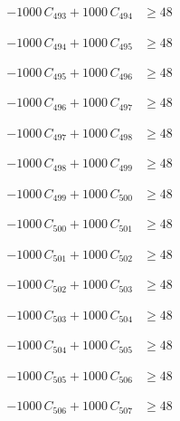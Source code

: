 \documentclass[a4paper,11pt]{article}
\begin{document}
\begin{align}
-1000\,C_{493} + 1000\,C_{494} &\geq 48 \nonumber
\end{align}

\begin{align}
-1000\,C_{494} + 1000\,C_{495} &\geq 48 \nonumber
\end{align}

\begin{align}
-1000\,C_{495} + 1000\,C_{496} &\geq 48 \nonumber
\end{align}

\begin{align}
-1000\,C_{496} + 1000\,C_{497} &\geq 48 \nonumber
\end{align}

\begin{align}
-1000\,C_{497} + 1000\,C_{498} &\geq 48 \nonumber
\end{align}

\begin{align}
-1000\,C_{498} + 1000\,C_{499} &\geq 48 \nonumber
\end{align}

\begin{align}
-1000\,C_{499} + 1000\,C_{500} &\geq 48 \nonumber
\end{align}

\begin{align}
-1000\,C_{500} + 1000\,C_{501} &\geq 48 \nonumber
\end{align}

\begin{align}
-1000\,C_{501} + 1000\,C_{502} &\geq 48 \nonumber
\end{align}

\begin{align}
-1000\,C_{502} + 1000\,C_{503} &\geq 48 \nonumber
\end{align}

\begin{align}
-1000\,C_{503} + 1000\,C_{504} &\geq 48 \nonumber
\end{align}

\begin{align}
-1000\,C_{504} + 1000\,C_{505} &\geq 48 \nonumber
\end{align}

\begin{align}
-1000\,C_{505} + 1000\,C_{506} &\geq 48 \nonumber
\end{align}

\begin{align}
-1000\,C_{506} + 1000\,C_{507} &\geq 48 \nonumber
\end{align}
\end{document}
